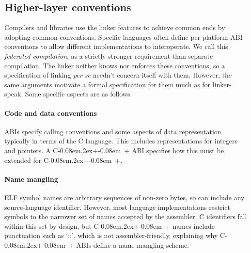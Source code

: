 \documentclass[preprint,10pt]{sigplanconf-pldi16}
\def\Cplusplus{C\kern-0.08em\raise.2ex\hbox{\footnotesize +\kern-0.08em +}}
\begin{document}
\subsection{Higher-layer conventions}
\label{sec:conventions}

Compilers and libraries use the linker features to achieve common ends
by adopting common conventions.
Specific languages often define per-platform ABI conventions to
allow different implementations to interoperate.
We call this \emph{federated compilation}, as a strictly stronger 
requirement than separate compilation.
The linker neither knows nor enforces these conventions, so 
a specification of linking \textit{per se} needn't concern itself with them.
However, the same arguments motivate a formal specification for them much as for linker-speak.
Some specific aspects are as follows.

\paragraph{Code and data conventions}
ABIs specify calling conventions and some aspects of data representation 
typically in terms of the C language.
This includes representations for integers and pointers.
A \Cplusplus{} ABI specifies how this must be extended for \Cplusplus{}.

\paragraph{Name mangling}
ELF symbol names are arbitrary sequences of non-zero bytes, so can include 
any source-language identifier. However, 
most language implementations restrict symbols
to the narrower set of names accepted by the assembler.
C identifiers fall within this set by design, but 
\Cplusplus{} names include punctuation such as `\textsf{::}', 
which is not assembler-friendly,
explaining why \Cplusplus{} ABIs define a name-mangling scheme.
\end{document}
